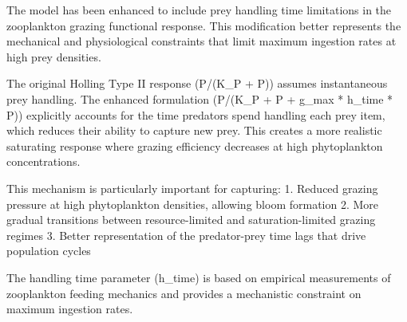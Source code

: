 The model has been enhanced to include prey handling time limitations in the zooplankton grazing functional response. This modification better represents the mechanical and physiological constraints that limit maximum ingestion rates at high prey densities.

The original Holling Type II response (P/(K_P + P)) assumes instantaneous prey handling. The enhanced formulation (P/(K_P + P + g_max * h_time * P)) explicitly accounts for the time predators spend handling each prey item, which reduces their ability to capture new prey. This creates a more realistic saturating response where grazing efficiency decreases at high phytoplankton concentrations.

This mechanism is particularly important for capturing:
1. Reduced grazing pressure at high phytoplankton densities, allowing bloom formation
2. More gradual transitions between resource-limited and saturation-limited grazing regimes
3. Better representation of the predator-prey time lags that drive population cycles

The handling time parameter (h_time) is based on empirical measurements of zooplankton feeding mechanics and provides a mechanistic constraint on maximum ingestion rates.
